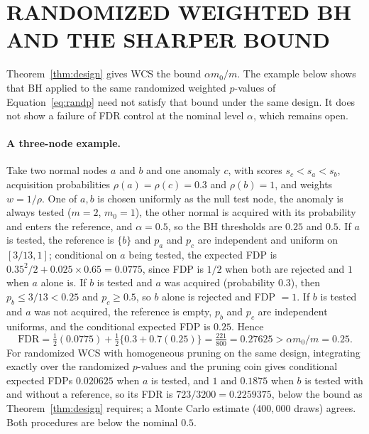 \section{RANDOMIZED WEIGHTED BH AND THE SHARPER BOUND}
\label{app:wbhcounter}

Theorem~\ref{thm:design} gives WCS the bound $\alpha m_0/m$. The example below shows that BH applied to the same randomized weighted $p$-values of Equation~\eqref{eq:randp} need not satisfy that bound under the same design. It does not show a failure of FDR control at the nominal level $\alpha$, which remains open.

\paragraph{A three-node example.}
Take two normal nodes $a$ and $b$ and one anomaly $c$, with scores $s_c<s_a<s_b$, acquisition probabilities $\rho(a)=\rho(c)=0.3$ and $\rho(b)=1$, and weights $w=1/\rho$. One of $a,b$ is chosen uniformly as the null test node, the anomaly is always tested ($m=2$, $m_0=1$), the other normal is acquired with its probability and enters the reference, and $\alpha=0.5$, so the BH thresholds are $0.25$ and $0.5$. If $a$ is tested, the reference is $\{b\}$ and $p_a$ and $p_c$ are independent and uniform on $[3/13,1]$; conditional on $a$ being tested, the expected FDP is $0.35^2/2+0.025\times0.65=0.0775$, since FDP is $1/2$ when both are rejected and $1$ when $a$ alone is. If $b$ is tested and $a$ was acquired (probability $0.3$), then $p_b\le3/13<0.25$ and $p_c\ge0.5$, so $b$ alone is rejected and FDP $=1$. If $b$ is tested and $a$ was not acquired, the reference is empty, $p_b$ and $p_c$ are independent uniforms, and the conditional expected FDP is $0.25$. Hence
\[
\mathrm{FDR}=\tfrac12(0.0775)+\tfrac12\{0.3+0.7(0.25)\}=\tfrac{221}{800}=0.27625>\alpha m_0/m=0.25 .
\]
For randomized WCS with homogeneous pruning on the same design, integrating exactly over the randomized $p$-values and the pruning coin gives conditional expected FDPs $0.020625$ when $a$ is tested, and $1$ and $0.1875$ when $b$ is tested with and without a reference, so its FDR is $723/3200=0.2259375$, below the bound as Theorem~\ref{thm:design} requires; a Monte Carlo estimate ($400{,}000$ draws) agrees. Both procedures are below the nominal $0.5$.

